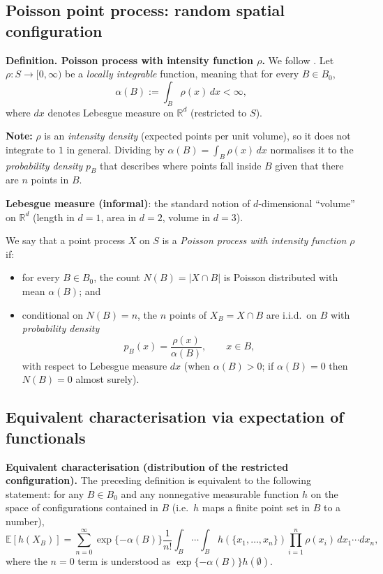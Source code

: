 \subsection{Poisson point process: random spatial configuration}

\noindent\textbf{Definition. Poisson process with intensity function $\rho$.}
We follow \cite{coeurjolly2017palm}.
Let $\rho:S\to[0,\infty)$ be a \emph{locally integrable} function, meaning that for every $B\in B_0$,
$$
\alpha(B) := \int_B \rho(x)\,dx < \infty,
$$
where $dx$ denotes Lebesgue measure on $\mathbb{R}^d$ (restricted to $S$).

\noindent\textbf{Note:} $\rho$ is an \emph{intensity density} (expected points per unit volume), so it does not integrate to $1$
in general. Dividing by $\alpha(B)=\int_B\rho(x)\,dx$ normalises it to the \emph{probability density} $p_B$ that describes
where points fall inside $B$ given that there are $n$ points in $B$.

\noindent\textbf{Lebesgue measure (informal)}: the standard notion of $d$-dimensional ``volume'' on $\mathbb{R}^d$
(length in $d{=}1$, area in $d{=}2$, volume in $d{=}3$).

We say that a point process $X$ on $S$ is a \emph{Poisson process with intensity function $\rho$} if:
\begin{itemize}
    \item for every $B\in B_0$, the count $N(B)=|X\cap B|$ is Poisson distributed with mean $\alpha(B)$; and
    \item conditional on $N(B)=n$, the $n$ points of $X_B=X\cap B$ are i.i.d.\ on $B$ with \emph{probability density}
    $$p_B(x)=\frac{\rho(x)}{\alpha(B)},\qquad x\in B,$$
    with respect to Lebesgue measure $dx$ (when $\alpha(B)>0$; if $\alpha(B)=0$ then $N(B)=0$ almost surely).
\end{itemize}


\subsection{Equivalent characterisation via expectation of functionals}

\noindent\textbf{Equivalent characterisation (distribution of the restricted configuration).}
The preceding definition is equivalent to the following statement: for any $B\in B_0$ and any nonnegative measurable
function $h$ on the space of configurations contained in $B$ (i.e.\ $h$ maps a finite point set in $B$ to a number),
$$
\mathbb{E}\!\left[h(X_B)\right]
=
\sum_{n=0}^{\infty}
\exp\{-\alpha(B)\}\frac{1}{n!}
\int_{B}\cdots\int_{B}
h(\{x_1,\ldots,x_n\})
\prod_{i=1}^{n}\rho(x_i)\,dx_1\cdots dx_n,
$$
where the $n=0$ term is understood as $\exp\{-\alpha(B)\}h(\emptyset)$.

